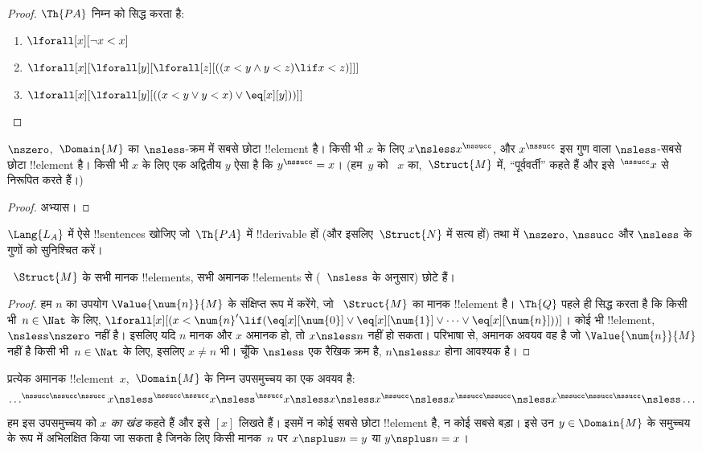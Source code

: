 \documentclass[../../../include/open-logic-section]{subfiles}
\begin{document}
\begin{proof}
$\Th{PA}$ निम्न को सिद्ध करता है:
\begin{enumerate}
\item $\lforall[x][\lnot x < x]$
\item $\lforall[x][\lforall[y][\lforall[z][((x < y \land y < z) \lif x < z)]]]$
\item $\lforall[x][\lforall[y][((x < y \lor y < x) \lor \eq[x][y]))]]$
\end{enumerate}
\end{proof}

\begin{prop}
 $\nszero$,~$\Domain{M}$ का $\nsless$-क्रम में
सबसे छोटा !!{element} है। किसी भी $x$ के लिए $x \nsless
x^\nssucc$, और
$x^\nssucc$ इस गुण वाला $\nsless$-सबसे छोटा !!{element} है। किसी भी $x$
के लिए एक अद्वितीय $y$ ऐसा है कि $y^\nssucc = x$। (हम~$y$ को
~$x$ का,~$\Struct{M}$ में, “पूर्ववर्ती” कहते हैं और इसे~$^\nssucc x$ से
निरूपित करते हैं।)
\end{prop}

\begin{proof}
अभ्यास।
\end{proof}

\begin{prob}
$\Lang{L_A}$ में ऐसे !!{sentence}s खोजिए जो~$\Th{PA}$ में
!!{derivable} हों (और इसलिए~$\Struct{N}$ में सत्य हों) तथा
 में $\nszero$, $\nssucc$ और
$\nsless$ के गुणों को सुनिश्चित करें।
\end{prob}

\begin{prop}
~$\Struct{M}$ के सभी मानक !!{element}s, सभी अमानक !!{element}s से
(~$\nsless$ के अनुसार) छोटे हैं।
\end{prop}

\begin{proof}
हम $n$ का उपयोग $\Value{\num{n}}{M}$ के संक्षिप्त रूप में करेंगे, जो
~$\Struct{M}$ का मानक !!{element} है। $\Th{Q}$ पहले ही सिद्ध करता है कि
किसी भी~$n
\in \Nat$ के लिए,
$\lforall[x][(x < \num{n}' \lif (\eq[x][\num{0}] \lor
  \eq[x][\num{1}] \lor \dots \lor \eq[x][\num{n}]))]$। कोई भी
!!{element}, $\nsless \nszero$ नहीं है। इसलिए यदि $n$ मानक और $x$ अमानक
हो, तो $x \nsless n$ नहीं हो सकता। परिभाषा से, अमानक अवयव वह है जो
$\Value{\num{n}}{M}$ नहीं है किसी भी~$n
\in \Nat$ के लिए, इसलिए $x \neq n$ भी।
चूँकि $\nsless$ एक रैखिक क्रम है, $n \nsless x$ होना आवश्यक है।
\end{proof}

\begin{prop}
प्रत्येक अमानक !!{element}~$x$,~$\Domain{M}$ के निम्न उपसमुच्चय का एक अवयव
है:
\[
\dots ^{\nssucc\nssucc\nssucc}x \nsless ^{\nssucc\nssucc}x \nsless
^{\nssucc}x \nsless x \nsless x^{\nssucc} \nsless x^{\nssucc\nssucc}
\nsless x^{\nssucc\nssucc\nssucc} \nsless \dots
\]
हम इस उपसमुच्चय को \emph{$x$ का खंड} कहते हैं और इसे $[x]$ लिखते हैं।
इसमें न कोई सबसे छोटा !!{element} है, न कोई सबसे बड़ा। इसे उन
$y \in \Domain{M}$ के समुच्चय के रूप में अभिलक्षित किया जा सकता है जिनके
लिए किसी मानक~$n$ पर $x \nsplus n = y$ या $y \nsplus n = x$।
\end{prop}
\end{document}
